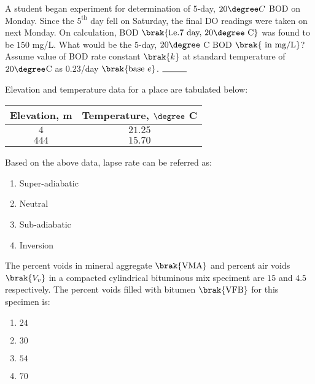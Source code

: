     \item A student began experiment for determination of $5$-day, $20\degree C$ BOD on Monday. Since the $5^{\text{th}}$ day fell on Saturday, the final DO readings were taken on next Monday. On calculation, BOD $\brak{\text{i.e.} 7 \text{ day, } 20\degree \text{ C}}$ was found to be $150$ mg/L. What would be the $5$-day, $20\degree$ C BOD $\brak{\text{ in mg/L}}$? Assume value of BOD rate constant $\brak{k}$ at standard temperature of $20\degree$C as $0.23$/day $\brak{\text{base } e}$. $\rule{1cm}{0.15mm}$ 
	\hfill{}

    \item Elevation and temperature data for a place are tabulated below:
	\begin{table}[h!]
		\centering
		\begin{tabular}[12pt]{ |c| c|}
			\hline
			Elevation, m & Temperature, $\degree$ C\\
			\hline
			$4$ & $21.25$\\
			\hline
			$444$ & $15.70$\\
			\hline
		\end{tabular}
	\end{table}

	Based on the above data, lapse rate can be referred as:
	\hfill{}

	\begin{enumerate}
		\item Super-adiabatic
		\item Neutral
		\item Sub-adiabatic
		\item Inversion
	\end{enumerate}

    \item The percent voids in mineral aggregate $\brak{\text{VMA}}$ and percent air voids $\brak{V_v}$ in a compacted cylindrical bituminous mix speciment are $15$ and $4.5$ respectively. The percent voids filled with bitumen $\brak{\text{VFB}}$ for this specimen is:
	\hfill{}
	\begin{enumerate}
		\item $24$
		\item $30$
		\item $54$
		\item $70$
	\end{enumerate}


